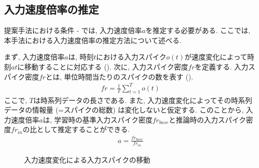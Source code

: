 \subsection{入力速度倍率の推定}
提案手法における条件 - では, 入力速度倍率$a$を推定する必要がある.
ここでは, 本手法における入力速度倍率の推定方法について述べる.

まず, 入力速度倍率$a$は, 時刻$t$における入力スパイク$o(t)$が速度変化によって時刻$at$に移動することに対応する ().
次に, 入力スパイク密度$fr$を定義する.
入力スパイク密度$fr$とは, 単位時間当たりのスパイクの数を表す ().
\begin{align}
    fr = \frac{1}{T} \sum_{t=1}^{T} o(t) \label{eq:input:spike:density}
\end{align}
ここで, $T$は時系列データの長さである.
また, 入力速度変化によってその時系列データの情報量 (=スパイクの総数) は変化しないと仮定する.
このことから, 入力速度倍率$a$は, 学習時の基準入力スパイク密度$fr_{base}$と推論時の入力スパイク密度$fr_{in}$の比として推定することができる.
\begin{align}
    a = \frac{fr_{base}}{fr_{in}}
\end{align}

\begin{figure}[htbp]
    \centering
    
    \caption{入力速度変化による入力スパイクの移動}
    \label{fig:input:speed:change}
\end{figure}


